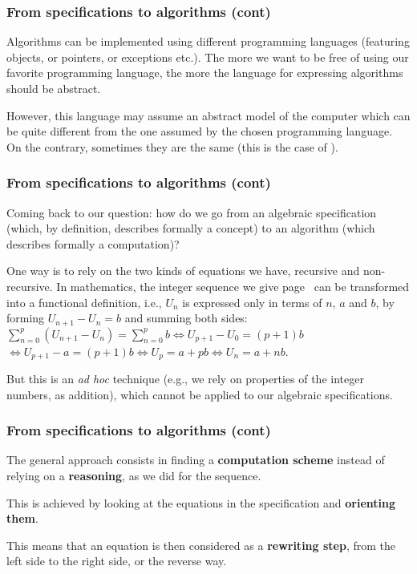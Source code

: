 %
\begin{frame}
\frametitle{From specifications to algorithms (cont)}

Algorithms can be implemented using different programming languages
(featuring objects, or pointers, or exceptions etc.). The more we want
to be free of using our favorite programming language, the more the
language for expressing algorithms should be abstract.

\bigskip

However, this language may assume an abstract model of the computer
which can be quite different from the one assumed by the chosen
programming language. On the contrary, sometimes they are the same
(this is the case of \Prolog).

\end{frame}

%
\begin{frame}
\frametitle{From specifications to algorithms (cont)}

Coming back to our question: how do we go from an algebraic
specification (which, by definition, describes formally a concept) to
an algorithm (which describes formally a computation)?

\bigskip

One way is to rely on the two kinds of equations we have, recursive
and non-recursive. In mathematics, the integer sequence we give
page~\pageref{sequence} can be transformed into a functional
definition, i.e., \(U_{n}\) is expressed only in terms of \(n\), \(a\)
and \(b\), by forming \(U_{n+1} - U_{n} = b\) and summing both sides:
\(\sum_{n=0}^{p}{(U_{n+1} - U_{n})} = \sum_{n=0}^{p}{b}
\Leftrightarrow U_{p+1} - U_{0} = (p+1) b\)\\ \(\Leftrightarrow
U_{p+1} - a = (p+1) b \Leftrightarrow U_{p} = a + pb \Leftrightarrow
U_{n} = a + nb\).

\bigskip

But this is an \emph{ad hoc} technique (e.g., we rely on properties of
the integer numbers, as addition), which cannot be applied to our
algebraic specifications.

\end{frame}

%
\begin{frame}
\frametitle{From specifications to algorithms (cont)}

The general approach consists in finding a \textbf{computation scheme}
instead of relying on a \textbf{reasoning}, as we did for the
sequence. 

\bigskip

This is achieved by looking at the equations in the specification and
\textbf{orienting them}. 

\bigskip

This means that an equation is then considered as a \textbf{rewriting
step}, from the left side to the right side, or the reverse way.

\end{frame}

